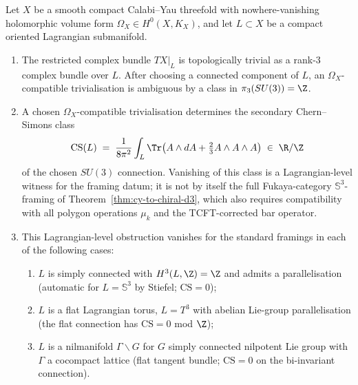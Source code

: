 \begin{proposition}
\label{prop:cy3-generic-framing}
Let $X$ be a smooth compact Calabi--Yau threefold with nowhere-vanishing
holomorphic volume form $\Omega_X \in H^0(X, K_X)$, and let $L \subset X$
be a compact oriented Lagrangian submanifold.
\begin{enumerate}[label=(\roman*)]
 \item The restricted complex bundle $TX|_L$ is topologically trivial as
 a rank-$3$ complex bundle over $L$. After choosing a connected
 component of $L$, an $\Omega_X$-compatible trivialisation is
 ambiguous by a class in $\pi_3(SU(3))=\Z$.
 \item A chosen $\Omega_X$-compatible trivialisation determines the
 secondary Chern--Simons class
 \[
 \mathrm{CS}(L) \;=\; \frac{1}{8\pi^2}\int_L \Tr\bigl(A\wedge dA +
 \tfrac{2}{3}A\wedge A \wedge A\bigr) \;\in\; \R/\Z
 \]
 of the chosen $SU(3)$ connection. Vanishing of this class is a
 Lagrangian-level witness for the framing datum; it is not by itself
 the full Fukaya-category $\mathbb{S}^3$-framing of
 Theorem~\ref{thm:cy-to-chiral-d3}, which also requires compatibility
 with all polygon operations $\mu_k$ and the TCFT-corrected bar
 operator.
 \item This Lagrangian-level obstruction vanishes for the standard
 framings in each of the following cases:
 \begin{enumerate}[label=(\alph*)]
 \item $L$ is simply connected with $H^3(L,\Z) = \Z$ and admits a
 parallelisation (automatic for $L = \mathbb{S}^3$ by Stiefel;
 $\mathrm{CS} = 0$);
 \item $L$ is a flat Lagrangian torus, $L = T^3$ with abelian
 Lie-group parallelisation (the flat connection has
 $\mathrm{CS} = 0$ mod $\Z$);
 \item $L$ is a nilmanifold $\Gamma \backslash G$ for $G$ simply
 connected nilpotent Lie group with $\Gamma$ a cocompact lattice
 (flat tangent bundle; $\mathrm{CS} = 0$ on the bi-invariant
 connection).
 \end{enumerate}
\end{enumerate}
\end{proposition}

